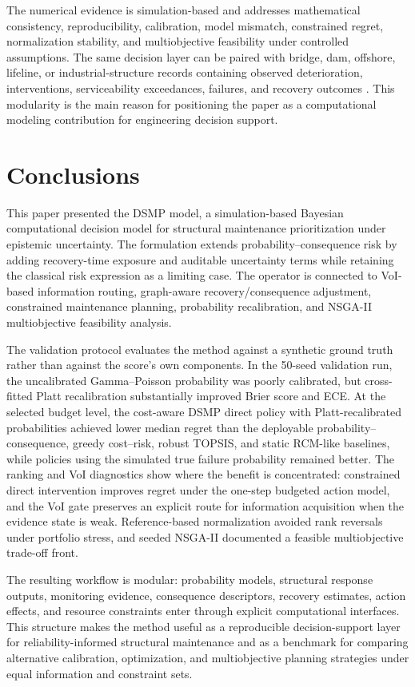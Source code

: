 \documentclass[cmes,article,submit,moreauthors,pdftex]{Definitions/tsp}
\begin{document}
The numerical evidence is simulation-based and addresses mathematical consistency, reproducibility, calibration, model mismatch, constrained regret, normalization stability, and multiobjective feasibility under controlled assumptions. The same decision layer can be paired with bridge, dam, offshore, lifeline, or industrial-structure records containing observed deterioration, interventions, serviceability exceedances, failures, and recovery outcomes \cite{saaty2008,brans1985,thons2018}. This modularity is the main reason for positioning the paper as a computational modeling contribution for engineering decision support.

\section{Conclusions}

This paper presented the DSMP model, a simulation-based Bayesian computational decision model for structural maintenance prioritization under epistemic uncertainty. The formulation extends probability--consequence risk by adding recovery-time exposure and auditable uncertainty terms while retaining the classical risk expression as a limiting case. The operator is connected to VoI-based information routing, graph-aware recovery/consequence adjustment, constrained maintenance planning, probability recalibration, and NSGA-II multiobjective feasibility analysis.

The validation protocol evaluates the method against a synthetic ground truth rather than against the score's own components. In the 50-seed validation run, the uncalibrated Gamma--Poisson probability was poorly calibrated, but cross-fitted Platt recalibration substantially improved Brier score and ECE. At the selected budget level, the cost-aware DSMP direct policy with Platt-recalibrated probabilities achieved lower median regret than the deployable probability--consequence, greedy cost--risk, robust TOPSIS, and static RCM-like baselines, while policies using the simulated true failure probability remained better. The ranking and VoI diagnostics show where the benefit is concentrated: constrained direct intervention improves regret under the one-step budgeted action model, and the VoI gate preserves an explicit route for information acquisition when the evidence state is weak. Reference-based normalization avoided rank reversals under portfolio stress, and seeded NSGA-II documented a feasible multiobjective trade-off front.

The resulting workflow is modular: probability models, structural response outputs, monitoring evidence, consequence descriptors, recovery estimates, action effects, and resource constraints enter through explicit computational interfaces. This structure makes the method useful as a reproducible decision-support layer for reliability-informed structural maintenance and as a benchmark for comparing alternative calibration, optimization, and multiobjective planning strategies under equal information and constraint sets.
\end{document}
